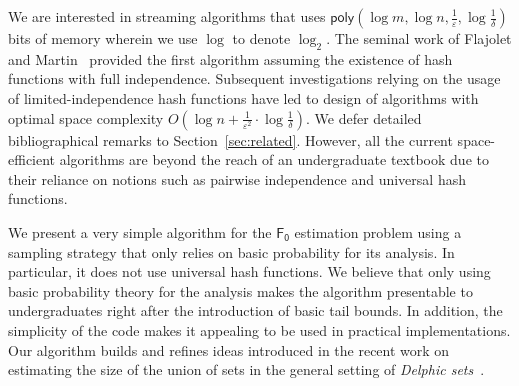 \documentclass[a4paper,UKenglish,cleveref, autoref, thm-restate]{lipics-v2021}
\newcommand{\Fo}{\ensuremath{\mathsf{F_0}}}
\begin{document}
 
 We are interested in streaming algorithms that uses $\mathsf{poly}(\log m, \log n, \frac{1}{\varepsilon}, \log \frac{1}{\delta})$ bits of memory wherein we use $\log$ to denote $\log_2$. 
 The seminal work of Flajolet and Martin~\cite{FM85} provided the first algorithm assuming the existence of hash functions with full independence. Subsequent investigations relying on the usage of limited-independence hash functions have led to design of algorithms with optimal space complexity $O(\log n + \frac{1}{\varepsilon^2}\cdot \log\frac{1}{\delta})$. We defer detailed bibliographical remarks to Section~\ref{sec:related}. 
However, all the current space-efficient algorithms are beyond the reach of an undergraduate textbook due to their reliance on  notions such as pairwise independence and universal hash functions. 



We present a very simple algorithm for the $\Fo$ estimation problem using  a sampling strategy  that only relies on basic probability for its analysis. In particular, it does not use  universal hash functions. We believe that only using basic probability theory for the analysis makes the algorithm presentable to undergraduates right after the introduction of basic tail bounds. In addition,  the simplicity of the code makes it appealing to be used in practical implementations.  Our algorithm builds and refines ideas introduced in the recent work on estimating the size of the union of sets in the general setting of {\em Delphic sets}~\cite{MVC21}.     
\end{document}
